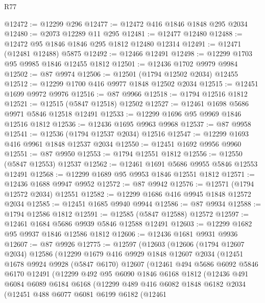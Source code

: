 \begin{lexlean}{R77}
\begin{coremodule}
@12472 := @12299 @296
@12477 := @12472 @416 @1846 @1848 @295 @2034
@12480 := @2073 @12289 @11 @295
@12481 := @12477 @12480
@12488 := @12472 @95 @1846 @1846 @295 @1812 @12480 @12314
@12491 := @12471 (@12481 @12488) @5875
@12492 := @12466 @12491
@12498 := @12299 @1703 @95 @9985 @1846 @12455 @1812
@12501 := @12436 @1702 @9979 @9984
@12502 := @87 @9974
@12506 := @12501 (@1794 @12502 @2034) @12455
@12512 := @12299 @1700 @416 @9977 @1848 @12502 @2034
@12515 := @12451 @1699 @9972 @9976
@12516 := @87 @9966
@12518 := @1794 @12516 @1812
@12521 := @12515 (@5847 @12518) @12502
@12527 := @12461 @1698 @5686 @9971 @5846 @12518 @12491
@12533 := @12299 @1696 @95 @9969 @1846 @12516 @1812
@12536 := @12436 @1695 @9963 @9968
@12537 := @87 @9958
@12541 := @12536 (@1794 @12537 @2034) @12516
@12547 := @12299 @1693 @416 @9961 @1848 @12537 @2034
@12550 := @12451 @1692 @9956 @9960
@12551 := @87 @9950
@12553 := @1794 @12551 @1812
@12556 := @12550 (@5847 @12553) @12537
@12562 := @12461 @1691 @5686 @9955 @5846 @12553 @12491
@12568 := @12299 @1689 @95 @9953 @1846 @12551 @1812
@12571 := @12436 @1688 @9947 @9952
@12572 := @87 @9942
@12576 := @12571 (@1794 @12572 @2034) @12551
@12582 := @12299 @1686 @416 @9945 @1848 @12572 @2034
@12585 := @12451 @1685 @9940 @9944
@12586 := @87 @9934
@12588 := @1794 @12586 @1812
@12591 := @12585 (@5847 @12588) @12572
@12597 := @12461 @1684 @5686 @9939 @5846 @12588 @12491
@12603 := @12299 @1682 @95 @9937 @1846 @12586 @1812
@12606 := @12436 @1681 @9931 @9936
@12607 := @87 @9926
@12775 := @12597
    (@12603
      (@12606
        (@1794 @12607 @2034)
        @12586
        (@12299
          @1679
          @416
          @9929
          @1848
          @12607
          @2034
          (@12451
            @1678
            @9924
            @9928
            (@5847 @6170)
            @12607
            (@12461
              @494
              @5686
              @6092
              @5846
              @6170
              @12491
              (@12299
                @492
                @95
                @6090
                @1846
                @6168
                @1812
                (@12436
                  @491
                  @6084
                  @6089
                  @6184
                  @6168
                  (@12299
                    @489
                    @416
                    @6082
                    @1848
                    @6182
                    @2034
                    (@12451
                      @488
                      @6077
                      @6081
                      @6199
                      @6182
                      (@12461

\end{coremodule}
\end{lexlean}
